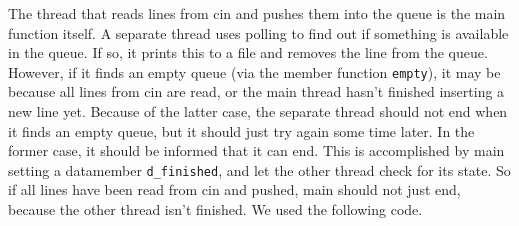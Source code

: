 \documentclass[12pt]{article}
\begin{document}
The thread that reads lines from cin and pushes them into the queue is the main function itself. A separate thread uses polling to find out if something is available in the queue. If so, it prints this to a file and removes the line from the queue. However, if it finds an empty queue (via the member function \texttt{empty}), it may be because all lines from cin are read, or the main thread hasn't finished inserting a new line yet. Because of the latter case, the separate thread should not end when it finds an empty queue, but it should just try again some time later. In the former case, it should be informed that it can end. This is accomplished by main setting a datamember \texttt{d\_finished}, and let the other thread check for its state.   
So if all lines have been read from cin and pushed, main should not just end, because the other thread isn't finished.  
We used the following code.
    
    
 

 
 
 
 
 




\clearpage
\end{document}
